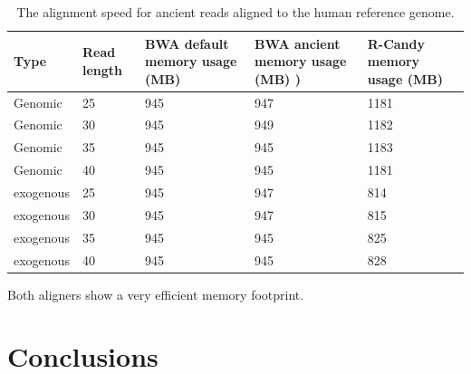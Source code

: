 \documentclass[11pt,a4paper]{report}
\begin{document}
\begin{table}[H]
  \begin{tabular}{ |  p{2cm} | p{2cm} | p{2cm} | p{2cm} |p{2cm} | }
    \hline
  	\textbf{Type} & \textbf{Read length }&\textbf{ BWA  
  		default memory usage (MB) }
  	&\textbf{ BWA ancient memory usage (MB) )} 
  	& \textbf{R-Candy memory usage (MB) }\\ \hline
 	  Genomic    & 25  & 945 &  947   &  1181 \\ \hline
      Genomic    & 30  & 945 &  949  &  1182 \\ \hline
      Genomic    & 35  & 945 &  945   &  1183 \\ \hline
 	  Genomic	 & 40  & 945 &  945   &  1181 \\ \hline
 	  exogenous  & 25  & 945 &  947   &  814 \\ \hline
      exogenous  & 30  & 945 &  947   &  815 \\ \hline
 	  exogenous  & 35  & 945 &  945   &  825 \\ \hline
 	  exogenous  & 40  & 945 &  945   &  828 \\ \hline
   \end{tabular}
\caption{The alignment speed for ancient reads aligned to 
the human reference genome.}
\label{speed-RG}
\end{table}

Both aligners show a very efficient memory footprint.








\section{Conclusions} \label{Conclusions}
\end{document}
